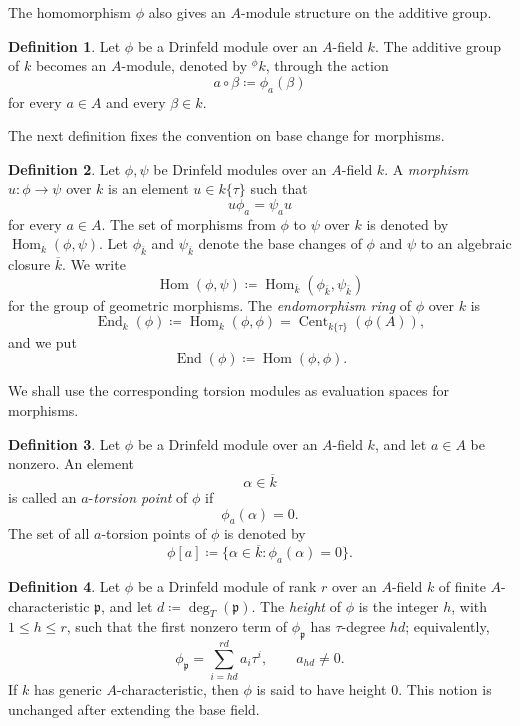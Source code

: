 \documentclass[10pt,a4paper]{amsart}
\DeclareMathOperator{\End}{End}
\DeclareMathOperator{\Hom}{Hom}
\DeclareMathOperator{\Cent}{Cent}
\theoremstyle{definition}
\newtheorem{definition}{Definition}[section]
\theoremstyle{plain}
\theoremstyle{remark}
\newcommand{\p}{\mathfrak p}
\begin{document}
The homomorphism $\phi$ also gives an $A$-module structure on the additive group.

\begin{definition}
Let $\phi$ be a Drinfeld module over an $A$-field $k$. The additive group of $k$ becomes an $A$-module, denoted by ${}^{\phi}k$, through the action
$$
a\circ \beta \coloneqq \phi_a(\beta)
$$
for every $a\in A$ and every $\beta\in k$.
\end{definition}

The next definition fixes the convention on base change for morphisms.

\begin{definition}
Let $\phi,\psi$ be Drinfeld modules over an $A$-field $k$. A \emph{morphism} $u:\phi\rightarrow\psi$ over $k$ is an element $u\in k\{\tau\}$ such that
$$
u\phi_a=\psi_a u
$$
for every $a\in A$. The set of morphisms from $\phi$ to $\psi$ over $k$ is denoted by $\Hom_k(\phi,\psi)$. Let $\phi_{\overline{k}}$ and $\psi_{\overline{k}}$ denote the base changes of $\phi$ and $\psi$ to an algebraic closure $\overline{k}$. We write
$$
\Hom(\phi,\psi)\coloneqq \Hom_{\overline{k}}(\phi_{\overline{k}},\psi_{\overline{k}})
$$
for the group of geometric morphisms. The \emph{endomorphism ring} of $\phi$ over $k$ is
$$
\End_k(\phi)\coloneqq \Hom_k(\phi,\phi)
=
\Cent_{k\{\tau\}}(\phi(A)),
$$
and we put
$$
\End(\phi)\coloneqq \Hom(\phi,\phi).
$$
\end{definition}

We shall use the corresponding torsion modules as evaluation spaces for morphisms.

\begin{definition}
Let $\phi$ be a Drinfeld module over an $A$-field $k$, and let $a\in A$ be nonzero. An element
$$
\alpha\in \overline{k}
$$
is called an $a$-\emph{torsion point} of $\phi$ if
$$
\phi_a(\alpha)=0.
$$
The set of all $a$-torsion points of $\phi$ is denoted by
$$
\phi[a]\coloneqq \{\alpha\in\overline{k}:\phi_a(\alpha)=0\}.
$$
\end{definition}

\begin{definition}
Let $\phi$ be a Drinfeld module of rank $r$ over an $A$-field $k$ of finite $A$-characteristic $\p$, and let $d\coloneqq \deg_T(\p)$. The \emph{height} of $\phi$ is the integer $h$, with $1\leq h\leq r$, such that the first nonzero term of $\phi_\p$ has $\tau$-degree $hd$; equivalently,
$$
\phi_\p=\sum_{i=hd}^{rd} a_i\tau^i,
\qquad
a_{hd}\neq 0.
$$
If $k$ has generic $A$-characteristic, then $\phi$ is said to have height $0$. This notion is unchanged after extending the base field.
\end{definition}
\end{document}

